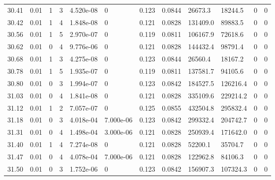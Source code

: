 \documentclass[preview]{standalone}
\begin{document}
{{{{{{{{\begin{tabular}{L{1.2cm}C{1.2cm} C{0.3cm}C{0.5cm} C{1.4cm}C{1.4cm} C{1.4cm}C{1.4cm} C{1.6cm}C{1.6cm} C{1.6cm}C{1.6cm}}
  30.41  &  0.01  & 1     &  3 &  4.520e-08  & 0  &  0.123&   0.0844& 26673.3 & 18244.5   &  0 & 0  \\ 
  30.42  &  0.01  & 1     &  4 &  1.848e-08  & 0  &  0.121&   0.0828& 131409.0 & 89883.5   &  0 & 0  \\ 
  30.56  &  0.01  & 1     &  5 &  2.970e-07  & 0  &  0.119&   0.0811& 106167.9 & 72618.6   &  0 & 0  \\ 
  30.62  &  0.01  & 0     &  4 &  9.776e-06  & 0  &  0.121&   0.0828& 144432.4 & 98791.4   &  0 & 0  \\ 
  30.68  &  0.01  & 1     &  3 &  4.275e-08  & 0  &  0.123&   0.0844& 26560.4 & 18167.2   &  0 & 0  \\ 
  30.78  &  0.01  & 1     &  5 &  1.935e-07  & 0  &  0.119&   0.0811& 137581.7 & 94105.6   &  0 & 0  \\ 
  30.80  &  0.01  & 0     &  3 &  1.994e-07  & 0  &  0.123&   0.0842& 184527.5 & 126216.4   &  0 & 0  \\ 
  31.03  &  0.01  & 0     &  4 &  1.841e-08  & 0  &  0.121&   0.0828& 335109.6 & 229214.2   &  0 & 0  \\ 
  31.12  &  0.01  & 1     &  2 &  7.057e-07  & 0  &  0.125&   0.0855& 432504.8 & 295832.4   &  0 & 0  \\ 
  31.18  &  0.01  & 0     &  3 &  4.018e-04  & 7.000e-06  &  0.123&   0.0842& 299332.4 & 204742.7   &  0 & 0  \\ 
  31.31  &  0.01  & 0     &  4 &  1.498e-04  & 3.000e-06  &  0.121&   0.0828& 250939.4 & 171642.0   &  0 & 0  \\ 
  31.40  &  0.01  & 1     &  4 &  7.274e-08  & 0  &  0.121&   0.0828& 52200.1 & 35704.7   &  0 & 0  \\ 
  31.47  &  0.01  & 0     &  4 &  4.078e-04  & 7.000e-06  &  0.121&   0.0828& 122962.8 & 84106.3   &  0 & 0  \\ 
  31.50  &  0.01  & 0     &  3 &  1.752e-06  & 0  &  0.123&   0.0842& 156907.3 & 107324.3   &  0 & 0  \\ 
\hline 
\end{tabular} 

}}}}}}}}
\end{document}
